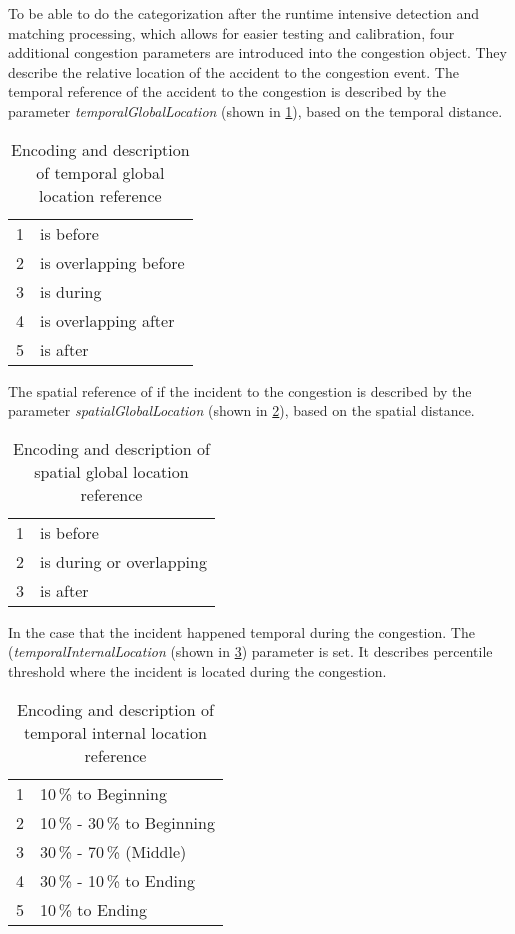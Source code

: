 To be able to do the categorization after the runtime intensive detection and matching processing, which allows for easier testing and calibration, four additional congestion parameters are introduced into the congestion object. They describe the relative location of the accident to the congestion event. The temporal reference of the accident to the congestion is described by the parameter \textit{temporalGlobalLocation} (shown in \cref{tbl:jam_classification_GLT}), based on the temporal distance.
\begin{table}[ht]
	\centering
	\begin{tabular}{c|l}  
		1 & is before \\ 
 		2 & is overlapping before \\ 
 		3 & is during \\
 		4 & is overlapping after \\
 		5 & is after \\
	\end{tabular}
	\caption{Encoding and description of temporal global location reference}
	\label{tbl:jam_classification_GLT}
	\vspace{-4mm}
\end{table}
The spatial reference of if the incident to the congestion is described by the parameter \textit{spatialGlobalLocation} (shown in \cref{tbl:jam_classification_GLS}), based on the spatial distance.
\begin{table}[ht]
	\centering
	\begin{tabular}{c|l}  
		1 & is before \\ 
 		2 & is during or overlapping \\ 
 		3 & is after \\ 
	\end{tabular}
	\caption{Encoding and description of spatial global location reference}
	\label{tbl:jam_classification_GLS}
	\vspace{-4mm}
\end{table}
In the case that the incident happened temporal during the congestion. The (\textit{temporalInternalLocation} (shown in \cref{tbl:jam_classification_ILT}) parameter is set. It describes percentile threshold where the incident is located during the congestion.
\begin{table}[ht]
	\centering
	\begin{tabular}{c|l}  
		1 & 10\,\% to Beginning \\
 		2 & 10\,\% - 30\,\% to Beginning \\
 		3 & 30\,\% - 70\,\% (Middle) \\
 		4 & 30\,\% - 10\,\% to Ending \\
 		5 & 10\,\% to Ending \\
	\end{tabular}
	\caption{Encoding and description of temporal internal location reference}
	\label{tbl:jam_classification_ILT}
	\vspace{-4mm}
\end{table}
